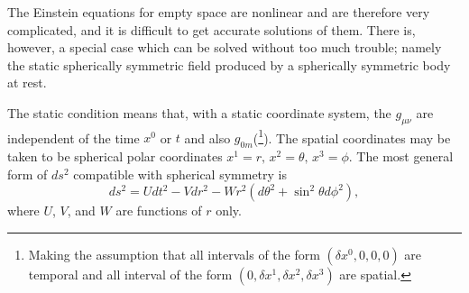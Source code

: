 The Einstein equations for empty space are nonlinear and are therefore very complicated, and it is difficult to get 
accurate solutions of them. There is, however, a special case which can be solved without too much trouble; namely the 
static spherically symmetric field produced by a spherically symmetric body at rest.

The static condition means that, with a static coordinate system, the $g_{\mu\nu}$ are independent of the time $x^0$ or 
$t$ and also $g_{0m}$(\footnote{Making the assumption that all intervals of the form $(\delta x^0,0,0,0)$ are temporal 
and all interval of the form $(0,\delta x^1, \delta x^2, \delta x^3)$ are spatial.}). The spatial coordinates may be 
taken to be spherical polar coordinates $x^1 = r,\,x^2=\theta,\,x^3=\phi$. The most general form of $ds^2$ compatible 
with spherical symmetry is
\[
 ds^2 = U dt^2 - V dr^2 -W r^2(d\theta^2 + \sin^2\theta d\phi^2),
\]
where $U$, $V$, and $W$ are functions of $r$ only.
